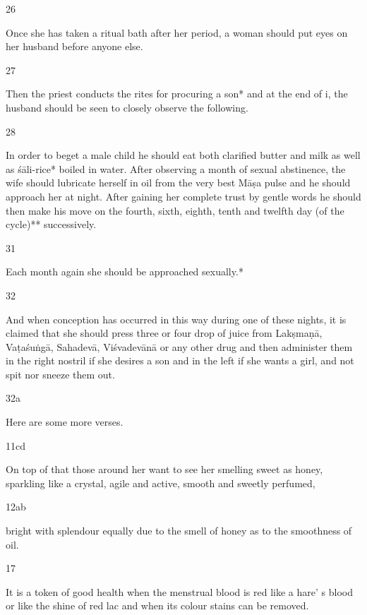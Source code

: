 \begin{translation}
\begin{tt}
\item[26]

Once she has taken a ritual bath after her period, a woman should put 
  eyes on her husband before anyone else.
  
\item[27]

Then the priest conducts the rites for procuring a son* and at the end of 
  i, the husband should be seen to closely observe the following.
  
\item[28]

 In order to beget a male child he should eat both clarified butter and 
  milk as well as śāli-rice* boiled in water. After observing a month of sexual 
  abstinence, the wife should lubricate herself in oil from the very best Māṣa 
  pulse and he should approach her at night. After gaining her complete trust by 
  gentle words he should then make his move on the fourth, sixth, eighth, tenth 
  and twelfth day (of the cycle)** successively.
  
\item[31]

Each month again she should be approached sexually.* 
  
\item[32]

And when conception has occurred in this way during one of these 
  nights, it is claimed that she should press three or four drop of juice from 
  Lakṣmaṇā, Vaṭaśuṅgā, Sahadevā, Viśvadevānā or any other drug and then 
  administer them in the right nostril if she desires a son and in the left if she 
  wants a girl, and not spit nor sneeze them out. 
  
\item[32a]

Here are some more verses.
  
\item[11cd]

On top of that those around her want to see her smelling sweet as 
  honey, sparkling like a crystal, agile and active, smooth and sweetly perfumed, 
  
\item[12ab]

bright with splendour equally due to the smell of honey as to the 
  smoothness of oil. 
  
\item[17]

It is a token of good health when the menstrual blood is red like a hare’ s 
  blood or like the shine of red lac and when its colour stains can be removed.
  

\end{tt}
\end{translation}
